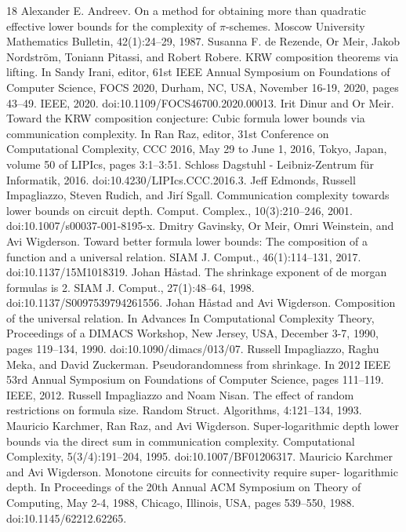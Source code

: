 \documentclass[10pt,a4paper]{article}
\begin{document}
\begin{thebibliography}{18}
 Alexander E. Andreev. On a method for obtaining more than quadratic effective lower bounds for the complexity of $\pi$-schemes. Moscow University Mathematics Bulletin, 42(1):24–29, 1987.
 Susanna F. de Rezende, Or Meir, Jakob Nordström, Toniann Pitassi, and Robert Robere. KRW composition theorems via lifting. In Sandy Irani, editor, 61st IEEE Annual Symposium on Foundations of Computer Science, FOCS 2020, Durham, NC, USA, November 16-19, 2020, pages 43–49. IEEE, 2020. doi:10.1109/FOCS46700.2020.00013.
 Irit Dinur and Or Meir. Toward the KRW composition conjecture: Cubic formula lower bounds via communication complexity. In Ran Raz, editor, 31st Conference on Computational Complexity, CCC 2016, May 29 to June 1, 2016, Tokyo, Japan, volume 50 of LIPIcs, pages 3:1–3:51. Schloss Dagstuhl - Leibniz-Zentrum für Informatik, 2016. doi:10.4230/LIPIcs.CCC.2016.3.
 Jeff Edmonds, Russell Impagliazzo, Steven Rudich, and Jirí Sgall. Communication complexity towards lower bounds on circuit depth. Comput. Complex., 10(3):210–246, 2001. doi:10.1007/s00037-001-8195-x.
 Dmitry Gavinsky, Or Meir, Omri Weinstein, and Avi Wigderson. Toward better formula lower bounds: The composition of a function and a universal relation. SIAM J. Comput., 46(1):114–131, 2017. doi:10.1137/15M1018319.
 Johan Håstad. The shrinkage exponent of de morgan formulas is 2. SIAM J. Comput., 27(1):48–64, 1998. doi:10.1137/S0097539794261556.
 Johan Håstad and Avi Wigderson. Composition of the universal relation. In Advances In Computational Complexity Theory, Proceedings of a DIMACS Workshop, New Jersey, USA, December 3-7, 1990, pages 119–134, 1990. doi:10.1090/dimacs/013/07.
 Russell Impagliazzo, Raghu Meka, and David Zuckerman. Pseudorandomness from shrinkage. In 2012 IEEE 53rd Annual Symposium on Foundations of Computer Science, pages 111–119. IEEE, 2012.
 Russell Impagliazzo and Noam Nisan. The effect of random restrictions on formula size. Random Struct. Algorithms, 4:121–134, 1993.
 Mauricio Karchmer, Ran Raz, and Avi Wigderson. Super-logarithmic depth lower bounds via the direct sum in communication complexity. Computational Complexity, 5(3/4):191–204, 1995. doi:10.1007/BF01206317.
 Mauricio Karchmer and Avi Wigderson. Monotone circuits for connectivity require super- logarithmic depth. In Proceedings of the 20th Annual ACM Symposium on Theory of Computing, May 2-4, 1988, Chicago, Illinois, USA, pages 539–550, 1988. doi:10.1145/62212.62265.

\end{thebibliography}
\end{document}
